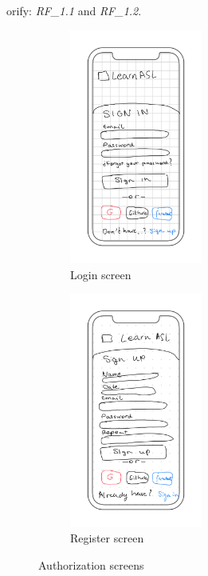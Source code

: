 orify: \textit{RF\_1.1} and \textit{RF\_1.2}. \\
\begin{figure}[H]
    \centering
    \begin{subfigure}[T]{0.49\textwidth}
        \centering
        \includegraphics[width=0.48\textwidth]{assets/screens/auth/Login.png}
        \caption{Login screen}
        \label{fig:design_screen_login}
    \end{subfigure}
    \hfill
    \begin{subfigure}[T]{0.49\textwidth}
        \centering
        \includegraphics[width=0.48\textwidth]{assets/screens/auth/Register.png}
        \caption{Register screen}
        \label{fig:design_screen_camera_register}
    \end{subfigure}
       \caption{Authorization screens}
       \label{fig:design_screens_auth}
\end{figure}

